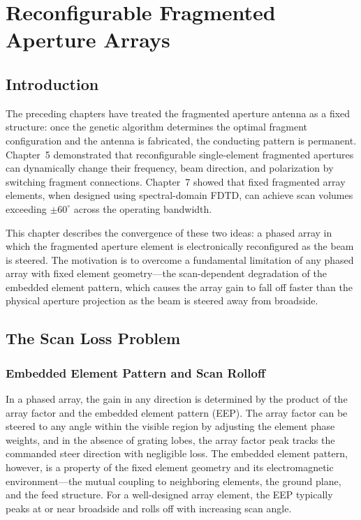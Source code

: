 \chapter{Reconfigurable Fragmented Aperture Arrays}

\section{Introduction}

The preceding chapters have treated the fragmented aperture antenna as a fixed structure: once the genetic algorithm determines the optimal fragment configuration and the antenna is fabricated, the conducting pattern is permanent.  Chapter~5 demonstrated that reconfigurable single-element fragmented apertures can dynamically change their frequency, beam direction, and polarization by switching fragment connections.  Chapter~7 showed that fixed fragmented array elements, when designed using spectral-domain FDTD, can achieve scan volumes exceeding $\pm 60^{\circ}$ across the operating bandwidth.

This chapter describes the convergence of these two ideas: a phased array in which the fragmented aperture element is electronically reconfigured as the beam is steered.  The motivation is to overcome a fundamental limitation of any phased array with fixed element geometry---the scan-dependent degradation of the embedded element pattern, which causes the array gain to fall off faster than the physical aperture projection as the beam is steered away from broadside.

\section{The Scan Loss Problem}

\subsection{Embedded Element Pattern and Scan Rolloff}

In a phased array, the gain in any direction is determined by the product of the array factor and the embedded element pattern (EEP).  The array factor can be steered to any angle within the visible region by adjusting the element phase weights, and in the absence of grating lobes, the array factor peak tracks the commanded steer direction with negligible loss.  The embedded element pattern, however, is a property of the fixed element geometry and its electromagnetic environment---the mutual coupling to neighboring elements, the ground plane, and the feed structure.  For a well-designed array element, the EEP typically peaks at or near broadside and rolls off with increasing scan angle.

